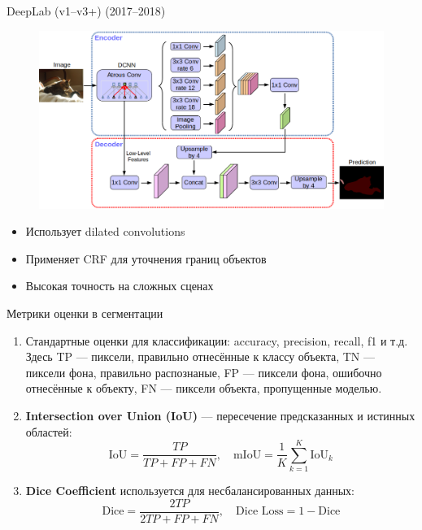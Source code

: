 \documentclass[notheorems, handout]{beamer}
\begin{document}
\begin{frame}{DeepLab (v1–v3+) (2017–2018)}
    \begin{figure}
        \includegraphics[width=\linewidth]{img/deeplab.png}
    \end{figure}

    \begin{itemize}
        \item Использует dilated convolutions
        \item Применяет CRF для уточнения границ объектов
        \item Высокая точность на сложных сценах
    \end{itemize}
\end{frame}

\begin{frame}{Метрики оценки в сегментации}
    \begin{enumerate}
        \item Стандартные оценки для классификации: accuracy, precision, recall, f1 и т.д. Здесь TP --- пиксели, правильно отнесённые к классу объекта, TN --- пиксели фона, правильно распознаные, FP --- пиксели фона, ошибочно отнесённые к объекту, FN --- пиксели объекта, пропущенные моделью.
        \item \textbf{Intersection over Union (IoU)} --- пересечение предсказанных и истинных областей:
        \[
            \text{IoU} = \frac{TP}{TP + FP + FN}, \quad
            \text{mIoU} = \frac{1}{K} \sum_{k=1}^{K} \text{IoU}_k
        \]
        \item \textbf{Dice Coefficient} используется для несбалансированных данных:
        \[
            \text{Dice} = \frac {2TP} {2TP + FP + FN}, \quad
            \text{Dice Loss} = 1 - \text{Dice}
        \]
    \end{enumerate}
\end{frame}
\end{document}

